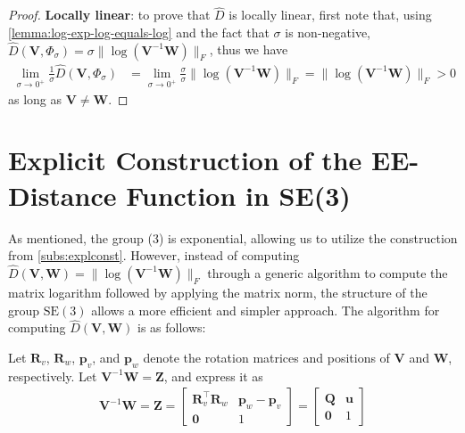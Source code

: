 \begin{proof}
    \textbf{Locally linear}: to prove that $\widehat{D}$ is locally linear, first note that, using \cref{lemma:log-exp-log-equals-log} and the fact that $\sigma$ is non-negative, $\widehat{D}(\mathbf{V}, \Phi_\sigma) = \sigma\|\log{\left(\mathbf{V}^{-1}\mathbf{W}\right)}\|_F$, thus we have
    \begin{align}
            \lim_{\sigma\to0^+}\frac{1}{\sigma}\widehat{D}(\mathbf{V}, \Phi_\sigma) &= \lim_{\sigma\to0^+}\frac{\sigma}{\sigma}\|\log{\left(\mathbf{V}^{-1}\mathbf{W}\right)}\|_F
            = \|\log{\left(\mathbf{V}^{-1}\mathbf{W}\right)}\|_F > 0
    \end{align}
    as long as $\mathbf{V} \not= \mathbf{W}$.
\end{proof}

\section{Explicit Construction of the EE-Distance Function in SE(3)}
As mentioned, the group (3) is exponential, allowing us to utilize the construction from \cref{subs:explconst}. However, instead of computing $\widehat{D}(\mathbf{V},\mathbf{W}) = \|\log(\mathbf{V}^{-1}\mathbf{W})\|_F$ through a generic algorithm to compute the matrix logarithm followed by applying the matrix norm, the structure of the group $\text{SE}(3)$ allows a more efficient and simpler approach. The algorithm for computing $\widehat{D}(\mathbf{V},\mathbf{W})$ is as follows:

Let $\mathbf{R}_v$, $\mathbf{R}_w$, $\mathbf{p}_v$, and $\mathbf{p}_w$ denote the rotation matrices and positions of $\mathbf{V}$ and $\mathbf{W}$, respectively. Let $\mathbf{V}^{-1}\mathbf{W} = \mathbf{Z}$, and express it as 
\begin{align*}
    \mathbf{V}^{-1}\mathbf{W} = \mathbf{Z} =\begin{bmatrix}
        \mathbf{R}_v^\top\mathbf{R}_w & \mathbf{p}_w - \mathbf{p}_v \\
        \mathbf{0} & 1
    \end{bmatrix}
    = \begin{bmatrix}
        \mathbf{Q} & \mathbf{u} \\
        \mathbf{0} & 1
    \end{bmatrix}
\end{align*}

